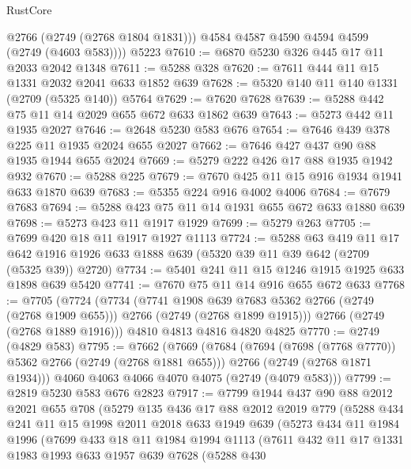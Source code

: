 \begin{lexlean}{RustCore}
\begin{coremodule}
          @2766
          (@2749 (@2768 @1804 @1831)))
        @4584
        @4587
        @4590
        @4594
        @4599
        (@2749 (@4603 @583))))
    @5223
@7610 := @6870 @5230 @326 @445 @17 @11 @2033 @2042 @1348
@7611 := @5288 @328
@7620 := @7611 @444 @11 @15 @1331 @2032 @2041 @633 @1852 @639
@7628 := @5320 @140 @11 @140 @1331 (@2709 (@5325 @140)) @5764
@7629 := @7620 @7628
@7639 := @5288 @442 @75 @11 @14 @2029 @655 @672 @633 @1862 @639
@7643 := @5273 @442 @11 @1935 @2027
@7646 := @2648 @5230 @583 @676
@7654 := @7646 @439 @378 @225 @11 @1935 @2024 @655 @2027
@7662 := @7646 @427 @437 @90 @88 @1935 @1944 @655 @2024
@7669 := @5279 @222 @426 @17 @88 @1935 @1942 @932
@7670 := @5288 @225
@7679 := @7670 @425 @11 @15 @916 @1934 @1941 @633 @1870 @639
@7683 := @5355 @224 @916 @4002 @4006
@7684 := @7679 @7683
@7694 := @5288 @423 @75 @11 @14 @1931 @655 @672 @633 @1880 @639
@7698 := @5273 @423 @11 @1917 @1929
@7699 := @5279 @263
@7705 := @7699 @420 @18 @11 @1917 @1927 @1113
@7724 := @5288
    @63
    @419
    @11
    @17
    @642
    @1916
    @1926
    @633
    @1888
    @639
    (@5320 @39 @11 @39 @642 (@2709 (@5325 @39)) @2720)
@7734 := @5401 @241 @11 @15 @1246 @1915 @1925 @633 @1898 @639 @5420
@7741 := @7670 @75 @11 @14 @916 @655 @672 @633
@7768 := @7705
    (@7724
      (@7734
        (@7741 @1908 @639 @7683 @5362 @2766 (@2749 (@2768 @1909 @655)))
        @2766
        (@2749 (@2768 @1899 @1915)))
      @2766
      (@2749 (@2768 @1889 @1916)))
    @4810
    @4813
    @4816
    @4820
    @4825
@7770 := @2749 (@4829 @583)
@7795 := @7662
    (@7669
      (@7684
        (@7694 (@7698 (@7768 @7770)) @5362 @2766 (@2749 (@2768 @1881 @655)))
        @2766
        (@2749 (@2768 @1871 @1934)))
      @4060
      @4063
      @4066
      @4070
      @4075
      (@2749 (@4079 @583)))
@7799 := @2819 @5230 @583 @676 @2823
@7917 := @7799
    @1944
    @437
    @90
    @88
    @2012
    @2021
    @655
    @708
    (@5279
      @135
      @436
      @17
      @88
      @2012
      @2019
      @779
      (@5288
        @434
        @241
        @11
        @15
        @1998
        @2011
        @2018
        @633
        @1949
        @639
        (@5273
          @434
          @11
          @1984
          @1996
          (@7699
            @433
            @18
            @11
            @1984
            @1994
            @1113
            (@7611
              @432
              @11
              @17
              @1331
              @1983
              @1993
              @633
              @1957
              @639
              @7628
              (@5288
                @430

\end{coremodule}
\end{lexlean}
